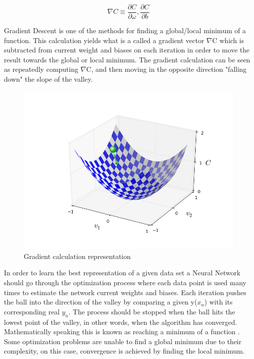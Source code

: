 $$\nabla C \equiv \frac{\partial C}{\partial \omega}, \frac{\partial C}{\partial b}$$

Gradient Descent is one of the methods for finding a global/local minimum of a function. This calculation yields what is a called a gradient vector $\nabla$C which is subtracted from current weight and biases on each iteration in order to move the result towards the global or local minimum. The gradient calculation can be seen as repeatedly computing $\nabla$C, and then moving in the opposite direction "falling down" the slope of the valley.

\begin{figure}[!ht]
\centering
	\includegraphics[scale=0.3]{valley_with_ball.png}
\caption{Gradient calculation representation \cite{nielsen2016}}
\label{fig:net_change}
\end{figure}
In order to learn the best representation of a given data set a Neural Network should go through the optimization process where each data point is used many times to estimate the network current weights and biases. Each iteration pushes the ball into the direction of the valley by comparing a given y($x_n$) with its corresponding real $y_n$. The process should be stopped when the ball hits the lowest point of the valley, in other words, when the algorithm has converged. Mathematically speaking this is known as reaching a minimum of a function \cite{nielsen2016}. Some optimization problems are unable to find a global minimum due to their complexity, on this case, convergence is achieved by finding the local minimum.

